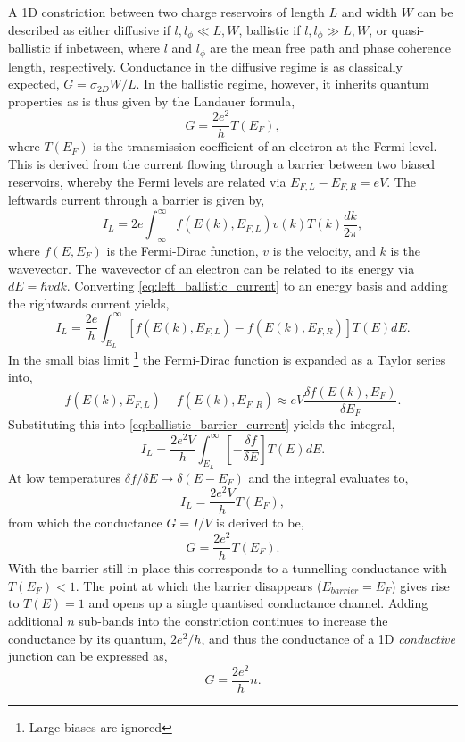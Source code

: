 \documentclass[12pt, a4paper, oneside]{book}
\begin{document}
A 1D constriction between two charge reservoirs of length $L$ and width $W$ can be described as either diffusive if $l,l_\phi \ll L,W$, ballistic if $l,l_\phi \gg L,W$, or quasi-ballistic if inbetween, where $l$ and $l_\phi$ are the mean free path and phase coherence length, respectively. Conductance in the diffusive regime is as classically expected, $G=\sigma_{2D}W/L$. In the ballistic regime, however, it inherits quantum properties as is thus given by the Landauer formula,
\begin{equation} G=\frac{2e^2}{h}T(E_F), \end{equation}
where $T(E_F)$ is the transmission coefficient of an electron at the Fermi level. This is derived from the current flowing through a barrier between two biased reservoirs, whereby the Fermi levels are related via $E_{F,L} - E_{F,R} = eV$. The leftwards current through a barrier is given by,
\begin{equation}
	I_L = 2e \int_{-\infty}^\infty f(E(k), E_{F,L}) v(k) T(k) \frac{dk}{2\pi},
	\label{eq:left_ballistic_current}
\end{equation}
where $f(E, E_F)$ is the Fermi-Dirac function, $v$ is the velocity, and $k$ is the wavevector. The wavevector of an electron can be related to its energy via $dE = \hbar v dk$. Converting \eqref{eq:left_ballistic_current} to an energy basis and adding the rightwards current yields,
\begin{equation}
	I_L = \frac{2e}{h} \int_{E_{L}}^\infty \left[ f(E(k), E_{F,L}) - f(E(k), E_{F,R}) \right] T(E) dE.
	\label{eq:ballistic_barrier_current}
\end{equation}
In the small bias limit%
\footnote{Large biases are ignored}
the Fermi-Dirac function is expanded as a Taylor series into,
\begin{equation}
	f(E(k), E_{F,L}) - f(E(k), E_{F,R}) \approx eV \frac{\delta f(E(k), E_F)}{\delta E_F}.
\end{equation}
Substituting this into \eqref{eq:ballistic_barrier_current} yields the integral,
\begin{equation}
	I_L = \frac{2e^2V}{h} \int_{E_{L}}^\infty \left[ -\frac{\delta f}{\delta E} \right] T(E) dE.
\end{equation}
At low temperatures $\delta f/\delta E \rightarrow \delta(E-E_F)$ and the integral evaluates to,
\begin{equation}
	I_L = \frac{2e^2V}{h}T(E_F),
\end{equation}
from which the conductance $G=I/V$ is derived to be,
\begin{equation}
		G = \frac{2e^2}{h}T(E_F).
\end{equation}
With the barrier still in place this corresponds to a tunnelling conductance with $T(E_F)<1$. The point at which the barrier disappears ($E_{barrier} = E_F$) gives rise to $T(E) = 1$ and opens up a single quantised conductance channel. Adding additional $n$ sub-bands into the constriction continues to increase the conductance by its quantum, $2e^2/h$, and thus the conductance of a 1D \emph{conductive} junction can be expressed as,
\begin{equation}
	G = \frac{2e^2}{h}n.
\end{equation}
\end{document}
